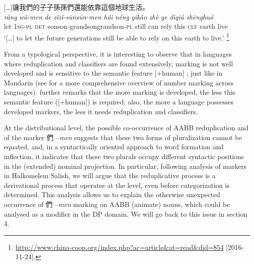 \documentclass[output=paper]{langsci/langscibook}
\begin{document}
\ex\label{ex:BascianoMelloni:30b} {[}\ldots{}{]}讓我們的子子孫孫們還能依靠這個地球生活。\\
\gll \emph{ràng} \emph{wǒ-men} \emph{de} \emph{zǐ\tld{}zǐ-sūn\tld{}sūn-men} \emph{hái} \emph{néng} \emph{yīkào} \emph{zhè} \emph{ge} \emph{dìqiú} \emph{shēnghuó}\\
let 1\textsc{sg-pl} \textsc{det} son\emph{\tld{}}son\emph{-}grandson\emph{\tld{}}grandson-\textsc{pl} still can rely this \textsc{clf} earth live\\
\glt `{[}\ldots{}{]} to let the future generations still be able to rely on
this earth to live.' \footnote{\url{http://www.china-coop.org/index.php?ac=article\&at=read\&did=854}   [2016-11-24].}

\z\z

\largerpage
From a typological perspective, it is interesting to observe that in
languages where reduplication and classifiers are found extensively,
 marking is not well developed and is sensitive to the semantic
feature {[}+human{]} %
\citep[12]{Xu2012a}%
%
, just like in Mandarin (see %
\citealt{Corbett2000} %
%
 for a more comprehensive overview of number marking across
languages). %
\citet{Xu2012a} %
%
further remarks that the more  marking is
developed, the less this semantic feature ({[}+human{]}) is required;
also, the more a language possesses developed  markers, the less
it needs reduplication and classifiers.

At the distributional level, the possible co-occurrence of AABB
reduplication and of the  marker 們 --\emph{men} suggests that
these two forms of pluralization cannot be equated, and, in a
syntactically oriented approach to word formation and inflection, it
indicates that these two plurals occupy different syntactic positions in
the (extended) nominal projection. In particular, following %
%
 analysis of  markers in Halkomelem Salish, we will argue
that the reduplicative process is a derivational process that operates
at the  level, even before  categorization is determined. This
analysis allows us to explain the otherwise unexpected occurrence of 們
--\emph{men}  marking on AABB (animate) nouns, which could be
analysed as a modifier in the DP domain. We will go back to this issue
in section 4.
\end{document}
